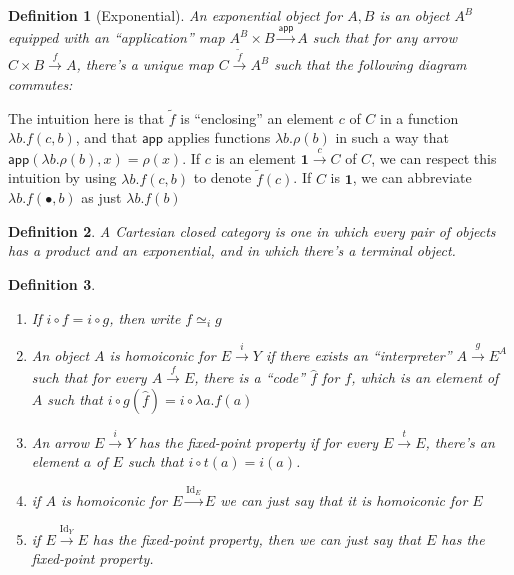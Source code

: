 \documentclass{article}
\newtheorem{definition}{Definition}
\DeclareMathOperator{\Id}{Id}
\begin{document}
\begin{definition}[Exponential]
  An exponential object for $A,B$ is an object $A^B$ equipped with an
  ``application'' map $A^B\times B \xrightarrow{\mathsf{app}} A$ such that for
  any arrow $C\times B \xrightarrow{f} A$, there's a unique map $C\xrightarrow{\tilde{f}}A^B$ such
  that the following diagram commutes:
  \begin{center}
  \end{center}
\end{definition}
The intuition here is that $\tilde{f}$ is ``enclosing'' an element $c$ of $C$ in
a function $\lambda b.f(c,b)$, and that $\mathsf{app}$ applies functions
$\lambda b. \rho(b)$ in such a way that $\mathsf{app}(\lambda b.\rho(b), x)
= \rho(x)$. If $c$ is an element $\mathbf{1}\xrightarrow{c} C$ of $C$, we can
respect this intuition by using $\lambda b.f(c,b)$ to denote $\tilde{f}(c)$. If
$C$ is $\mathbf{1}$, we can abbreviate $\lambda b.f(\bullet,b)$ as just
$\lambda b. f(b)$
\begin{definition} A Cartesian closed category is one in which every pair of
  objects has a product and an exponential, and in which there's a terminal
  object.
\end{definition}

\begin{definition}\
  \begin{enumerate}
    \item If $i\circ f = i\circ g$, then write $f\simeq_i g$
    \item An object $A$ is homoiconic for $E\xrightarrow{i}Y$ if there exists an
      ``interpreter'' $A\xrightarrow{g}E^A$ such that for every $A\xrightarrow{f} E$,
      there is a ``code'' $\hat{f}$ for $f$, which is an element of $A$ such that
      $i\circ g(\hat{f}) = i\circ \lambda a . f(a)$
    \item An arrow $E\xrightarrow{i}Y$ has the fixed-point property if for every
      $E\xrightarrow{t} E$, there's an element $a$ of $E$ such that $i\circ t(a) = i(a)$.
    \item if $A$ is homoiconic for $E\xrightarrow{\Id_E}E$ we can just say that
      it is homoiconic for $E$
    \item if $E\xrightarrow{\Id_Y} E$ has the fixed-point property, then we can
      just say that $E$ has the fixed-point property.
  \end{enumerate}
\end{definition}
\end{document}
